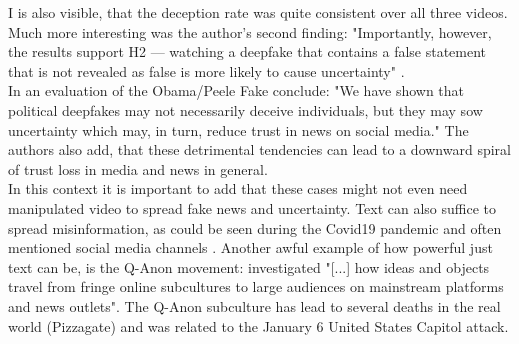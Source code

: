 \documentclass[
  a4paper,  %
  twoside,  %
  bibliography=totoc,
  headsepline,
  cleardoublepage=empty,
  parskip=half,
  draft=false
]{scrbook}
\begin{document}
I is also visible, that the deception rate was quite consistent over all three videos. Much more interesting was the author's second finding: "Importantly, however, the results support H2 — watching a deepfake that contains a false statement that is not revealed as false is more likely to cause uncertainty" \cite{vaccariDeepfakesDisinformationExploring2020}. \\
In an evaluation of the Obama/Peele Fake \citet{vaccariDeepfakesDisinformationExploring2020} conclude: "We have shown that political deepfakes may not necessarily deceive individuals, but they may sow uncertainty which may, in turn, reduce trust in news on social media." The authors also add, that these detrimental tendencies can lead to a downward spiral of trust loss in media and news in general. \\
In this context it is important to add that these cases might not even need manipulated video to spread fake news and uncertainty. Text can also suffice to spread misinformation, as could be seen during the Covid19 pandemic and often mentioned social media channels \cite{naeemExplorationHowFake2021}. Another awful example of how powerful just text can be, is the Q-Anon movement: \cite{zeeuwTracingNormieficationCrossplatform2020} investigated "[...] how ideas and objects travel from fringe online subcultures to large audiences on mainstream platforms and news outlets". The Q-Anon subculture has lead to several deaths in the real world (Pizzagate) and was related to the January 6 United States Capitol attack.
\end{document}
